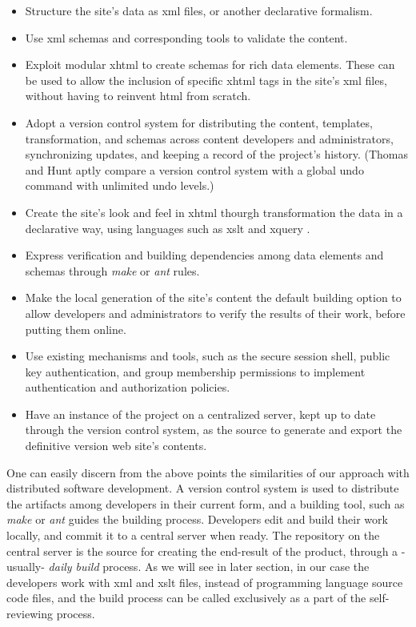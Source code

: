 \documentclass{elsart}
\begin{document}
\begin{itemize}
\item Structure the site's data as {\sc xml} files,
or another declarative formalism.
\item Use {\sc xml} schemas and corresponding tools to validate the content.
\item Exploit modular {\sc xhtml} \cite{W3C_MODULAR_XHTML} to create schemas for rich
data elements.
These can be used to allow the inclusion of specific {\sc xhtml} tags
in the site's {\sc xml} files, without having to reinvent {\sc html}
from scratch.
\item Adopt a version control system for distributing the content,
templates, transformation, and schemas across content developers and
administrators, synchronizing updates, and keeping a record of the project's history.
(Thomas and Hunt \cite{HT00} aptly compare a version control system
with a global undo command with unlimited undo levels.)
\item Create the site's look and feel in {\sc xhtml} thourgh transformation the data in a declarative way, using languages such as {\sc xslt} and {\sc xquery} \cite{HM01,NOV03}.
\item Express verification and building dependencies among
data elements and schemas through {\em make} \cite{MAKE} or {\em ant}
\cite{JAKARTA_ANT} rules.
\item Make the local generation of the site's content the default
building option to allow developers and administrators to verify
the results of  their work, before putting them online.
\item Use existing mechanisms and tools, such as the secure session shell,
public key authentication, and group membership permissions to implement
authentication and authorization policies.
\item Have an instance of the project on a centralized server, kept up to
date through the version control system, as the source to generate and export
the definitive version web site's contents.
\end{itemize}

One can easily discern from the above points the similarities of our
approach with distributed software development.
A version control system is used to distribute the artifacts among
developers in their current form, and a building tool, such as {\em make}
or {\em ant} guides the building process.
Developers edit and build their work locally, and commit it to a central server when ready.
The repository on the central server is the source for creating the end-result
of the product, through a -usually- {\em daily build} process.
As we will see in later section, in our case the developers work with {\sc xml} and {\sc xslt}
files, instead of programming language source code files, and the {\sc build} process can be called exclusively as a part of
the self-reviewing process.
\end{document}

